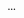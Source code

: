 \begin{changemargin}{-15mm}{-15mm}   
\begin{activite}[\dots]
\dots
\end{activite}
\end{changemargin}